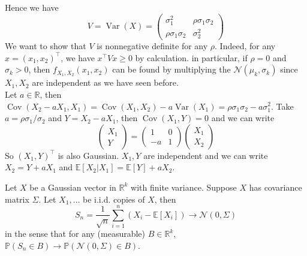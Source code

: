 Hence we have
$$V=\operatorname{Var}(X)=\begin{pmatrix}
    \sigma_1^2&\rho\sigma_1\sigma_2\\
    \rho\sigma_1\sigma_2&\sigma_2^2
\end{pmatrix}$$
We want to show that $V$ is nonnegative definite for any $\rho$.
Indeed, for any $x=(x_1,x_2)^\top$, we have $x^\top Vx\ge 0$ by calculation.
in particular, if $\rho=0$ and $\sigma_k>0$, then $f_{X_1,X_2}(x_1,x_2)$ can be found by multiplying the $\mathcal N(\mu_k,\sigma_k)$ since $X_1,X_2$ are independent as we have seen before.\\
Let $a\in\mathbb R$, then $\operatorname{Cov}(X_2-aX_1,X_1)=\operatorname{Cov}(X_1,X_2)-a\operatorname{Var}(X_1)=\rho\sigma_1\sigma_2-a\sigma_1^2$.
Take $a=\rho\sigma_1/\sigma_2$ and $Y=X_2-aX_1$, then $\operatorname{Cov}(X_1,Y)=0$ and we can write
$$\begin{pmatrix}
    X_1\\
    Y
\end{pmatrix}=\begin{pmatrix}
    1&0\\
    -a&1
\end{pmatrix}\begin{pmatrix}
    X_1\\
    X_2
\end{pmatrix}$$
So $(X_1,Y)^\top$ is also Gaussian.
$X_1,Y$ are independent and we can write $X_2=Y+aX_1$ and $\mathbb E[X_2|X_1]=\mathbb E[Y]+aX_2$.
\begin{theorem}
    Let $X$ be a Gaussian vector in $\mathbb R^k$ with finite variance.
    Suppose $X$ has covariance matrix $\Sigma$.
    Let $X_1,\ldots$ be i.i.d. copies of $X$, then
    $$S_n=\frac{1}{\sqrt{n}}\sum_{i=1}^n(X_i-\mathbb E[X_i])\to\mathcal N(0,\Sigma)$$
    in the sense that for any (measurable) $B\in\mathbb R^k$, $\mathbb P(S_n\in B)\to \mathbb P(\mathcal N(0,\Sigma)\in B)$.
\end{theorem}